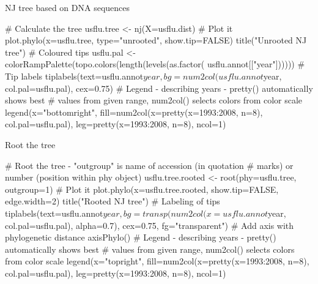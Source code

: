 \documentclass[compress, ucs, xelatex, 11pt, xcolor=svgnames,
  hyperref={
    bookmarks=true,
    unicode=true,
    colorlinks=true,
    pdftitle={Molecular data in R},
    plainpages=false,
    pdfauthor={Vojtech Zeisek},
    pdfsubject={Course about phylogeny and evolution in R},
    pdfcreator={XeLaTeX},
    pdfkeywords={R, evolution, phylogeny, molecular data},
    linkcolor=Tomato,
    anchorcolor=SaddleBrown,
    citecolor=Goldenrod,
    filecolor=DarkMagenta,
    menucolor=Sienna,
    urlcolor=DarkTurquoise,
    pdftex},
  url={hyphens, lowtilde} %
  ]{beamer}
\begin{document}

\begin{frame}[fragile]{NJ tree based on DNA sequences}
  \begin{spluscode}
    # Calculate the tree
    usflu.tree <- nj(X=usflu.dist)
    # Plot it
    plot.phylo(x=usflu.tree, type="unrooted", show.tip=FALSE)
    title("Unrooted NJ tree")
    # Coloured tips
    usflu.pal <- colorRampPalette(topo.colors(length(levels(as.factor(
      usflu.annot[["year"])))))
    # Tip labels
    tiplabels(text=usflu.annot$year, bg=num2col(usflu.annot$year,
      col.pal=usflu.pal), cex=0.75)
    # Legend - describing years - pretty() automatically shows best
    # values from given range, num2col() selects colors from color scale
    legend(x="bottomright", fill=num2col(x=pretty(x=1993:2008, n=8),
      col.pal=usflu.pal), leg=pretty(x=1993:2008, n=8), ncol=1)
  \end{spluscode}
\end{frame}

\begin{frame}[fragile]{Root the tree}
  \begin{spluscode}
    # Root the tree - "outgroup" is name of accession (in quotation
    # marks) or number (position within phy object)
    usflu.tree.rooted <- root(phy=usflu.tree, outgroup=1)
    # Plot it
    plot.phylo(x=usflu.tree.rooted, show.tip=FALSE, edge.width=2)
    title("Rooted NJ tree")
    # Labeling of tips
    tiplabels(text=usflu.annot$year, bg=transp(num2col(x=usflu.annot$year,
      col.pal=usflu.pal), alpha=0.7), cex=0.75, fg="transparent")
    # Add axis with phylogenetic distance
    axisPhylo()
    # Legend - describing years - pretty() automatically shows best
    # values from given range, num2col() selects colors from color scale
    legend(x="topright", fill=num2col(x=pretty(x=1993:2008, n=8),
      col.pal=usflu.pal), leg=pretty(x=1993:2008, n=8), ncol=1)
  \end{spluscode}
\end{frame}
\end{document}
